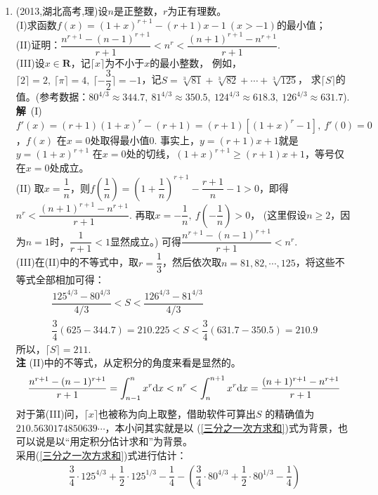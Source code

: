 \begin{enumerate}[label={【\textbf{例\thechapter.\arabic*}】},
 leftmargin=\inteval{\myenumleftmargin}pt,
 itemsep=\inteval{\myenumitempsep}pt,
 itemindent=\inteval{\myenumitemindent}pt]
\item (2013,湖北高考,理)设$ n $是正整数，$ r $为正有理数。\\
(I)求函数$ f(x)=(1+x)^{r+1}-(r+1)x-1\ (x>-1) $的最小值；\\
(II)证明：$ \dfrac{n^{r+1}-(n-1)^{r+1}}{r+1}<n^r<
\dfrac{(n+1)^{r+1}-n^{r+1}}{r+1} $. \\ 
(III)设$ x\in \textbf{R} $，记$ \lceil x \rceil $为不小于$ x $的最小整数，
例如，$ \lceil 2 \rceil=2,\ \lceil \pi \rceil=4,\ \lceil -\dfrac{3}{2}
\rceil=-1 $，记$ S=\sqrt[3]{81}+\sqrt[3]{82}+\cdots +\sqrt[3]{125} $，
求$ \lceil S \rceil $的值。(参考数据：$ 80^{4/3}\approx 344.7,\ 
81^{4/3}\approx 350.5,\ 124^{4/3}\approx 618.3,
\ 126^{4/3}\approx 631.7 $).\\
\textbf{解}\ (I) $ f'(x)=(r+1)(1+x)^r-(r+1)=(r+1)[(1+x)^r-1],\ f'(0)=0 $，$ f(x) $
在$ x=0 $处取得最小值0. 事实上，$ y=(r+1)x+1 $就是$ y=(1+x)^{r+1} $
在$ x=0 $处的切线，$ (1+x)^{r+1}\geq (r+1)x+1 $，等号仅在$ x=0 $处成立。\\
(II) 取$ x=\dfrac{1}{n} $，则$ f(\dfrac{1}{n})=\left(1+
\dfrac{1}{n}\right)^{r+1}-\dfrac{r+1}{n}-1>0 $，即得$ n^r<
\dfrac{(n+1)^{r+1}-n^{r+1}}{r+1} $. 再取$ x=-\dfrac{1}{n},\ 
f(-\dfrac{1}{n})>0 $，
(这里假设$ n\geq 2 $，因为$ n=1 $时，$ \dfrac{1}{r+1}<1 $显然成立。)
可得$ \dfrac{n^{r+1}-(n-1)^{r+1}}{r+1}<n^r $. \\
(III)在(II)中的不等式中，取$ r=\dfrac{1}{3} $，然后依次取$ n=81,82,\cdots,
125 $，将这些不等式全部相加可得：
\begin{gather*}
    \dfrac{125^{4/3}-80^{4/3}}{4/3}<S<\dfrac{126^{4/3}-81^{4/3}}{4/3} \\
    \dfrac{3}{4}(625-344.7)=210.225<S<\dfrac{3}{4}(631.7-350.5)=210.9
\end{gather*}
所以，$ \lceil S \rceil =211 $. \\
\textbf{注} (II)中的不等式，从定积分的角度来看是显然的。
\begin{gather*}
    \dfrac{n^{r+1}-(n-1)^{r+1}}{r+1}=\int_{n-1}^n x^r \mathrm{d} x<n^r<
    \int_{n}^{n+1} x^r \mathrm{d} x=\dfrac{(n+1)^{r+1}-n^{r+1}}{r+1}
\end{gather*}
对于第(III)问，$ \lceil x \rceil $也被称为向上取整，借助软件可算出$ S $
的精确值为$ 210.5630174850639 \cdots $，本小问其实就是以
(\ref{三分之一次方求和})式为背景，也可以说是以“用定积分估计求和”为背景。 \\
\mycircled{1} 采用(\ref{三分之一次方求和})式进行估计：
\begin{align*}
    \dfrac{3}{4}\cdot 125^{4/3}+\dfrac{1}{2}\cdot 125^{1/3}-\dfrac{1}{4}-
    \left(\dfrac{3}{4}\cdot 80^{4/3}+\dfrac{1}{2}\cdot 80^{1/3}-\dfrac{1}{4} \right) 

\end{align*}
\end{enumerate}
